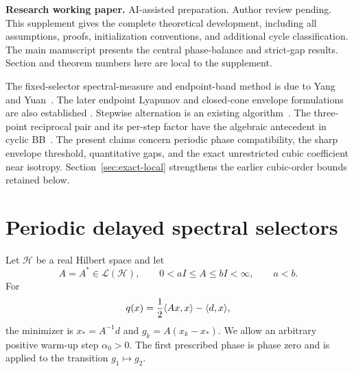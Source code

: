 \documentclass[letterpaper,twoside]{article}
\begin{document}
\onecolumn
{}
\noindent\textbf{Research working paper.} AI-assisted preparation. Author review pending. This supplement gives the complete theoretical development, including all assumptions, proofs, initialization conventions, and additional cycle classification. The main manuscript presents the central phase-balance and strict-gap results. Section and theorem numbers here are local to the supplement.

The fixed-selector spectral-measure and endpoint-band method is due to Yang and Yuan~\cite{YangYuan2026}. The later endpoint Lyapunov and closed-cone envelope formulations are also established \cite{YangYuanLyapunov2026,YangYuanCone2026}. Stepwise alternation is an existing algorithm~\cite{GrippoSciandrone2002,DaiFletcherProjected2005}. The three-point reciprocal pair and its per-step factor have the algebraic antecedent in cyclic BB~\cite{DaiHagerSchittkowskiZhang2006}. The present claims concern periodic phase compatibility, the sharp envelope threshold, quantitative gaps, and the exact unrestricted cubic coefficient near isotropy. Section~\ref{sec:exact-local} strengthens the earlier cubic-order bounds retained below.

\section{Periodic delayed spectral selectors}\label{sec:setting}

Let $\mathcal H$ be a real Hilbert space and let
\begin{equation}\label{eq:operator-bounds}
 A=A^*\in\mathcal L(\mathcal H),
 \qquad 0<aI\le A\le bI<\infty,
 \qquad a<b.
\end{equation}
For
\[
 q(x)=\frac12\langle Ax,x\rangle-\langle d,x\rangle,
\]
the minimizer is $x_*=A^{-1}d$ and
$g_k=A(x_k-x_*)$.  We allow an arbitrary positive warm-up step
$\alpha_0>0$.  The first prescribed phase is phase zero and is applied to
the transition $g_1\mapsto g_2$.
\end{document}

